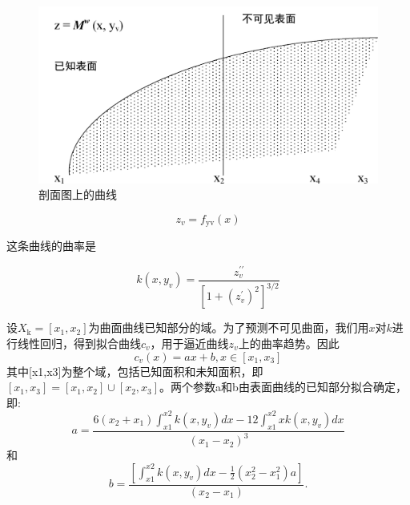\documentclass[AutoFakeBold,zihao=-4]{ctexart}
\begin{document}
	\begin{figure}[h]
		\centering
		\includegraphics[scale=0.2]{PIC4}
		\caption{剖面图上的曲线}
		\label{fig-Curve}
	\end{figure}

	\begin{equation}
		z_{v}=f_{\mathrm{yv}}(x)
		\label{eq8}
	\end{equation}

	这条曲线的曲率是

	\begin{equation}
		k\left(x, y_{v}\right)=\frac{z_{v}^{\prime \prime}}{\left[1+\left(z_{v}^{\prime}\right)^{2}\right]^{3 / 2}}
		\label{eq9}
	\end{equation}

	设$ X_{\mathrm{k}}=\left[x_{1}, x_{2}\right] $为曲面曲线已知部分的域。为了预测不可见曲面，我们用$ x $对$ k $进行线性回归，得到拟合曲线$ c_{v} $，用于逼近曲线$ z_{v} $上的曲率趋势。因此
	\begin{equation}
		c_{v}(x)=a x+b, x \in\left[x_{1}, x_{3}\right]
		\label{eq10}
	\end{equation}
	其中[x1,x3]为整个域，包括已知面积和未知面积，即$ \left[x_{1}, x_{3}\right]=\left[x_{1}, x_{2}\right] \cup\left[x_{2}, x_{3}\right] $。两个参数a和b由表面曲线的已知部分拟合确定，即:
	\begin{equation}
		a=\frac{6\left(x_{2}+x_{1}\right) \int_{x 1}^{x 2} k\left(x, y_{v}\right) d x-12 \int_{x 1}^{x 2} x k\left(x, y_{v}\right) d x}{\left(x_{1}-x_{2}\right)^{3}}
		\label{eq11}
	\end{equation}
	和
	\begin{equation}
		b=\frac{\left[\int_{x 1}^{x 2} k\left(x, y_{v}\right) d x-\frac{1}{2}\left(x_{2}^{2}-x_{1}^{2}\right) a\right]}{\left(x_{2}-x_{1}\right)} .
		\label{eq12}
	\end{equation}
\end{document}
